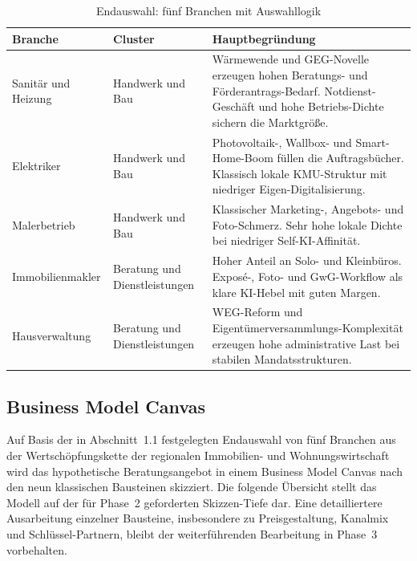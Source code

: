 \documentclass[a4paper,11pt]{article}
\begin{document}
\begin{table}[H]
\centering
\caption{Endauswahl: fünf Branchen mit Auswahllogik}
\label{tab:top5}
\begin{tabular}{p{3.5cm}p{3.5cm}p{8cm}}
\toprule
\textbf{Branche} & \textbf{Cluster} & \textbf{Hauptbegründung} \\
\midrule
Sanitär und Heizung & Handwerk und Bau & Wärmewende und GEG-Novelle erzeugen hohen Beratungs- und Förderantrags-Bedarf. Notdienst-Geschäft und hohe Betriebs-Dichte sichern die Marktgröße. \\
Elektriker & Handwerk und Bau & Photovoltaik-, Wallbox- und Smart-Home-Boom füllen die Auftrags\-bücher. Klassisch lokale KMU-Struktur mit niedriger Eigen-Digitalisierung. \\
Malerbetrieb & Handwerk und Bau & Klassischer Marketing-, Angebots- und Foto-Schmerz. Sehr hohe lokale Dichte bei niedriger Self-KI-Affinität. \\
Immobilienmakler & Beratung und Dienst\-leistungen & Hoher Anteil an Solo- und Kleinbüros. Exposé-, Foto- und GwG-Workflow als klare KI-Hebel mit guten Margen. \\
Hausverwaltung & Beratung und Dienst\-leistungen & WEG-Reform und Eigentümer\-versammlungs-Komplexität erzeugen hohe administrative Last bei stabilen Mandats\-strukturen. \\
\bottomrule
\end{tabular}
\end{table}

\subsection{Business Model Canvas}

Auf Basis der in Abschnitt~1.1 festgelegten Endauswahl von fünf
Branchen aus der Wertschöpfungskette der regionalen Immobilien- und
Wohnungswirtschaft wird das hypothetische Beratungsangebot in einem
Business Model Canvas nach den neun klassischen Bausteinen
skizziert. Die folgende Übersicht stellt das Modell auf der für Phase~2
geforderten Skizzen-Tiefe dar. Eine detailliertere Ausarbeitung
einzelner Bausteine, insbesondere zu Preisgestaltung, Kanalmix und
Schlüssel-Partnern, bleibt der weiterführenden Bearbeitung in Phase~3
vorbehalten.
\end{document}
